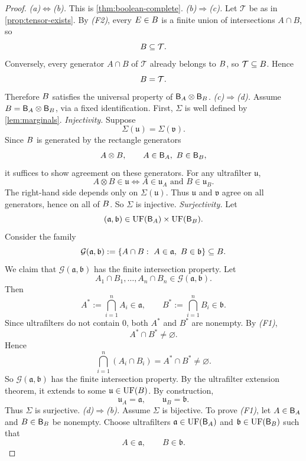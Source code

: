 \begin{proof}
	\emph{(a)\(\Leftrightarrow\)(b).}
	This is \cref{thm:boolean-complete}.
	\medskip
	\emph{(b)\(\Rightarrow\)(c).}
	Let \(\mathcal T\) be as in \cref{prop:tensor-exists}. By \emph{(F2)},
	every \(E\in B\) is a finite union of intersections \(A\cap B\), so
	\[
		B\subseteq\mathcal T.
	\]
	Conversely, every generator \(A\cap B\) of \(\mathcal T\) already
	belongs to \(B\), so \(\mathcal T\subseteq B\). Hence
	\[
		B=\mathcal T.
	\]
	Therefore \(B\) satisfies the universal property of \(\mathsf B_A\otimes\mathsf B_B\).
	\medskip
	\emph{(c)\(\Rightarrow\)(d).}
	Assume \(B=\mathsf B_A\otimes\mathsf B_B\), via a fixed identification.
	First, \(\Sigma\) is well defined by \cref{lem:marginals}.
	\smallskip
	\emph{Injectivity.}
	Suppose
	\[
		\Sigma(\mathfrak u)=\Sigma(\mathfrak v).
	\]
	Since \(B\) is generated by the rectangle generators
	\[
		A\otimes B,\qquad A\in\mathsf B_A,\ B\in\mathsf B_B,
	\]
	it suffices to show agreement on these generators. For any ultrafilter
	\(\mathfrak u\),
	\[
		A\otimes B\in\mathfrak u
		\iff
		A\in\mathfrak u_A \text{ and } B\in\mathfrak u_B.
	\]
	The right-hand side depends only on \(\Sigma(\mathfrak u)\). Thus
	\(\mathfrak u\) and \(\mathfrak v\) agree on all generators, hence on
	all of \(B\). So \(\Sigma\) is injective.
	\smallskip
	\emph{Surjectivity.}
	Let
	\[
		(\mathfrak a,\mathfrak b)\in\operatorname{UF}(\mathsf B_A)\times\operatorname{UF}(\mathsf B_B).
	\]
	Consider the family
	\[
		\mathcal G(\mathfrak a,\mathfrak b)
		:=
		\{A\cap B:\ A\in\mathfrak a,\ B\in\mathfrak b\}\subseteq B.
	\]
	We claim that \(\mathcal G(\mathfrak a,\mathfrak b)\) has the finite
	intersection property. Let
	\[
		A_1\cap B_1,\dots,A_n\cap B_n\in\mathcal G(\mathfrak a,\mathfrak b).
	\]
	Then
	\[
		A^\ast:=\bigcap_{i=1}^n A_i\in\mathfrak a,
		\qquad
		B^\ast:=\bigcap_{i=1}^n B_i\in\mathfrak b.
	\]
	Since ultrafilters do not contain \(0\), both \(A^\ast\) and \(B^\ast\)
	are nonempty. By \emph{(F1)},
	\[
		A^\ast\cap B^\ast\neq\varnothing.
	\]
	Hence
	\[
		\bigcap_{i=1}^n (A_i\cap B_i)=A^\ast\cap B^\ast\neq\varnothing.
	\]
	So \(\mathcal G(\mathfrak a,\mathfrak b)\) has the finite intersection
	property. By the ultrafilter extension theorem, it extends to some
	\(\mathfrak u\in\operatorname{UF}(B)\). By construction,
	\[
		\mathfrak u_A=\mathfrak a,
		\qquad
		\mathfrak u_B=\mathfrak b.
	\]
	Thus \(\Sigma\) is surjective.
	\medskip
	\emph{(d)\(\Rightarrow\)(b).}
	Assume \(\Sigma\) is bijective.
	To prove \emph{(F1)}, let \(A\in\mathsf B_A\) and \(B\in\mathsf B_B\) be nonempty.
	Choose ultrafilters \(\mathfrak a\in\operatorname{UF}(\mathsf B_A)\) and \(\mathfrak b\in\operatorname{UF}(\mathsf B_B)\)
	such that
	\[
		A\in\mathfrak a,
		\qquad
		B\in\mathfrak b.
\]
\end{proof}
